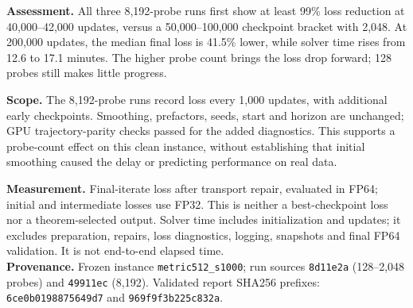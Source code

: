 \textbf{Assessment.} All three 8,192-probe runs first show at least 99\% loss
reduction at 40,000--42,000 updates, versus a 50,000--100,000 checkpoint bracket
with 2,048. At 200,000 updates, the median final loss is 41.5\% lower, while solver
time rises from 12.6 to 17.1 minutes. The higher probe count brings the loss drop
forward; 128 probes still makes little progress.

\textbf{Scope.} The 8,192-probe runs record loss every 1,000 updates, with
additional early checkpoints. Smoothing, prefactors, seeds, start and horizon are
unchanged; GPU trajectory-parity checks passed for the added diagnostics. This
supports a probe-count effect on this clean instance, without establishing that
initial smoothing caused the delay or predicting performance on real data.

\vfill
{\footnotesize\color{muted}\textbf{Measurement.} Final-iterate loss after transport repair, evaluated in FP64;
initial and intermediate losses use FP32. This is neither a best-checkpoint loss
nor a theorem-selected output. Solver time includes initialization and updates;
it excludes preparation, repairs, loss diagnostics, logging, snapshots and final
FP64 validation. It is not end-to-end elapsed time.\\[3pt]
\textbf{Provenance.} Frozen instance \texttt{metric512\_s1000}; run sources \texttt{8d11e2a}
(128--2,048 probes) and \texttt{49911ec} (8,192). Validated report SHA256 prefixes:
\texttt{6ce0b0198875649d7} and \texttt{969f9f3b225c832a}.}
